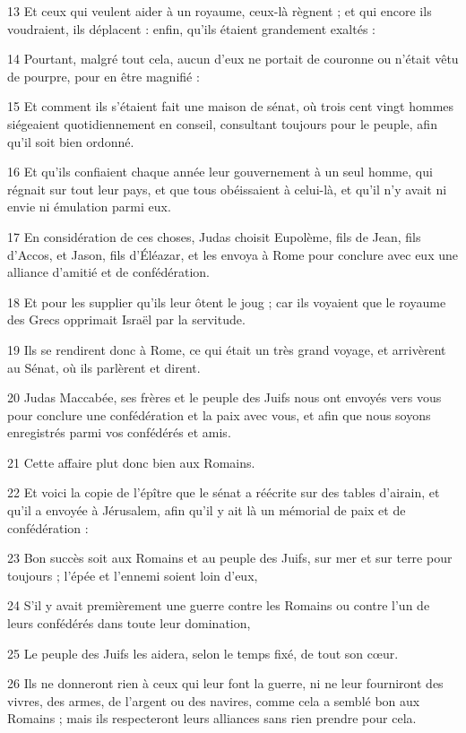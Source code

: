 \par 13 Et ceux qui veulent aider à un royaume, ceux-là règnent ; et qui encore ils voudraient, ils déplacent : enfin, qu'ils étaient grandement exaltés :
\par 14 Pourtant, malgré tout cela, aucun d'eux ne portait de couronne ou n'était vêtu de pourpre, pour en être magnifié :
\par 15 Et comment ils s'étaient fait une maison de sénat, où trois cent vingt hommes siégeaient quotidiennement en conseil, consultant toujours pour le peuple, afin qu'il soit bien ordonné.
\par 16 Et qu'ils confiaient chaque année leur gouvernement à un seul homme, qui régnait sur tout leur pays, et que tous obéissaient à celui-là, et qu'il n'y avait ni envie ni émulation parmi eux.
\par 17 En considération de ces choses, Judas choisit Eupolème, fils de Jean, fils d'Accos, et Jason, fils d'Éléazar, et les envoya à Rome pour conclure avec eux une alliance d'amitié et de confédération.
\par 18 Et pour les supplier qu'ils leur ôtent le joug ; car ils voyaient que le royaume des Grecs opprimait Israël par la servitude.
\par 19 Ils se rendirent donc à Rome, ce qui était un très grand voyage, et arrivèrent au Sénat, où ils parlèrent et dirent.
\par 20 Judas Maccabée, ses frères et le peuple des Juifs nous ont envoyés vers vous pour conclure une confédération et la paix avec vous, et afin que nous soyons enregistrés parmi vos confédérés et amis.
\par 21 Cette affaire plut donc bien aux Romains.
\par 22 Et voici la copie de l'épître que le sénat a réécrite sur des tables d'airain, et qu'il a envoyée à Jérusalem, afin qu'il y ait là un mémorial de paix et de confédération :
\par 23 Bon succès soit aux Romains et au peuple des Juifs, sur mer et sur terre pour toujours ; l'épée et l'ennemi soient loin d'eux,
\par 24 S'il y avait premièrement une guerre contre les Romains ou contre l'un de leurs confédérés dans toute leur domination,
\par 25 Le peuple des Juifs les aidera, selon le temps fixé, de tout son cœur.
\par 26 Ils ne donneront rien à ceux qui leur font la guerre, ni ne leur fourniront des vivres, des armes, de l'argent ou des navires, comme cela a semblé bon aux Romains ; mais ils respecteront leurs alliances sans rien prendre pour cela.
